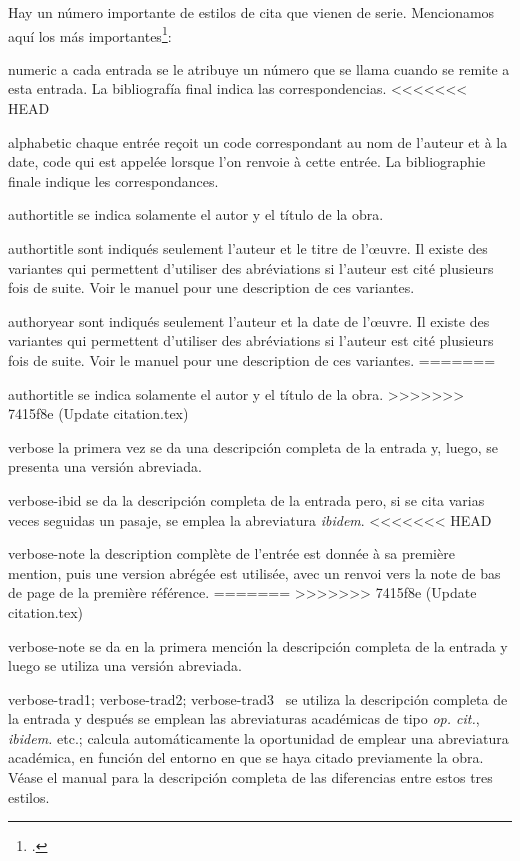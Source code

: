 Hay un número importante de estilos de cita que vienen de
serie. Mencionamos aquí los más importantes\footcite[Para más
detalles, véase][]{biblatex_style}:
\begin{choix}
\item[numeric]a cada entrada se le atribuye un número que se llama
  cuando se remite a esta entrada. La bibliografía final indica las correspondencias.
<<<<<<< HEAD
\item[alphabetic]chaque entrée reçoit un code correspondant au nom de l'auteur et à la date, code qui est appelée lorsque l'on renvoie à cette entrée. La bibliographie finale indique les correspondances.%
\item[authortitle]se indica solamente el autor y el título de la obra.
\item[authortitle]sont indiqués seulement l'auteur et le titre de l'œuvre. Il existe des variantes qui permettent d'utiliser des abréviations si l'auteur est cité plusieurs fois de suite. Voir le manuel pour une description de ces variantes.%
\item[authoryear]sont indiqués seulement l'auteur et la date de l'œuvre. Il existe des variantes qui permettent d'utiliser des abréviations si l'auteur est cité plusieurs fois de suite. Voir le manuel pour une description de ces variantes.%
=======
\item[authortitle]se indica solamente el autor y el título de la obra.
>>>>>>> 7415f8e (Update citation.tex)
\item[verbose]la primera vez se da una descripción completa de la
  entrada y, luego, se presenta una versión abreviada.
\item[verbose-ibid]se da la descripción completa de la entrada pero,
  si se cita varias veces seguidas un pasaje, se emplea la abreviatura \emph{ibidem}.
<<<<<<< HEAD
  \item[verbose-note]la description complète de l'entrée est donnée à sa première mention, puis une version abrégée est utilisée, avec un renvoi vers la note de bas de page de la première référence.%
=======
>>>>>>> 7415f8e (Update citation.tex)
\item[verbose-note]se da en la primera mención la descripción completa
  de la entrada y luego se utiliza una versión abreviada.
\item[verbose-trad1; verbose-trad2; verbose-trad3]~se utiliza la
  descripción completa de la entrada y después se emplean las abreviaturas
  académicas de tipo \emph{op. cit.}, \emph{ibidem.} etc.;
   calcula automáticamente la oportunidad de emplear
  una abreviatura académica, en función del entorno en que se haya
  citado previamente la obra. Véase el manual para la descripción
  completa de las diferencias entre estos tres estilos.
\end{choix}

